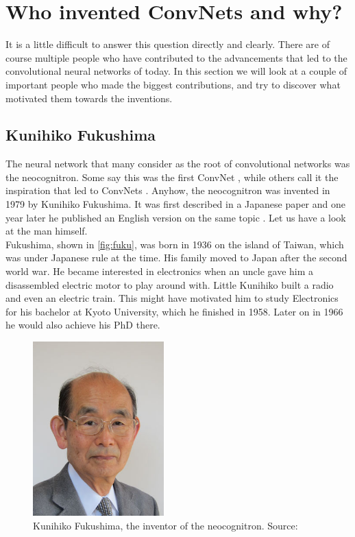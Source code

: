 \section{Who invented ConvNets and why?}

It is a little difficult to answer this question directly and clearly. There are of course multiple people who have contributed to the advancements that led to the convolutional neural networks of today. In this section we will look at a couple of important people who made the biggest contributions, and try to discover what motivated them towards the inventions.\\

\subsection{Kunihiko Fukushima}

The neural network that many consider as the root of convolutional networks was the neocognitron. Some say this was the first ConvNet \cite{sch, fuzzy}, while others call it the inspiration that led to ConvNets \cite{dl-lecun, history}. Anyhow, the neocognitron was invented in 1979 by Kunihiko Fukushima. It was first described in a Japanese paper \cite{jap} and one year later he published an English version on the same topic \cite{neocog}. Let us have a look at the man himself.\\

Fukushima, shown in \autoref{fig:fuku}, was born in 1936 \cite{about-fuku} on the island of Taiwan, which was under Japanese rule at the time. His family moved to Japan after the second world war. He became interested in electronics when an uncle gave him a disassembled electric motor to play around with. Little Kunihiko built a radio and even an electric train. This might have motivated him to study Electronics for his bachelor at Kyoto University, which he finished in 1958. Later on in 1966 he would also achieve his PhD there.\\

\begin{figure}
    \centering
    \includegraphics[width=0.45\textwidth]{images/Fukushima.jpg}
    \caption{Kunihiko Fukushima, the inventor of the neocognitron. Source: \cite{fuzzy}}
    \label{fig:fuku}
\end{figure}

